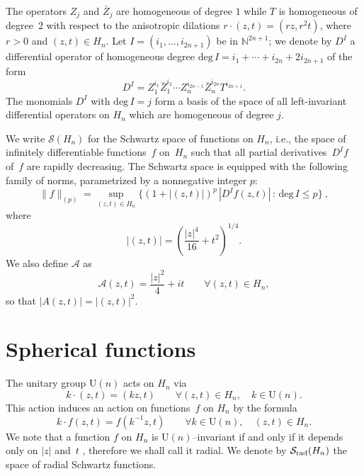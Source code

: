 \documentclass[12pt,a4paper]{amsart}
\theoremstyle{plain}
\theoremstyle{definition}
\numberwithin{equation}{section}
\begin{document}
The operators $Z_j$ and $\bar Z_j$ are homogeneous of degree $1$
while $T$ is homogeneous of degree~$2$
with respect to the anisotropic dilations
$r\cdot (z,t)=(rz,r^2t)$, where $r>0$ and $(z,t)\in {{H_{n}}}$.
Let $I=(i_1,\ldots,i_{2{n}+1})$ be in ${\mathbb N}^{2{n}+1}$;
we denote by ${{D}}^I$ a
differential operator of homogeneous degree 
$\text{deg}\,I=i_1+\cdots+i_{2{n}}+2i_{2{n}+1}$ of the form
\begin{equation}
\label{monomi}
{{D}}^I=Z_{1}^{i_1} \bar Z_1^{i_2}
\cdots Z_{n}^{i_{2{n}-1}} \bar Z_n^{i_{2{n}}} T^{i_{2{n}+1}} .
\end{equation}
The monomials ${{D}}^I$ with  $\text{deg}\,I=j$
form a basis of the space of all left-invariant differential operators on ${{H_{n}}}$ 
which are homogeneous of degree
$j$.

We write ${\mathcal S} ({{H_{n}}})$ for the Schwartz space of
functions on ${{H_{n}}}$, i.e., the space of infinitely differentiable
functions~$f$ on~${{H_{n}}}$ such that
all  partial derivatives~${{D}}^I f$ of~$f$
are rapidly decreasing.
The Schwartz space is equipped with the following
family of norms, parametrized by a nonnegative integer $p$:
$$
\|f\|_{(p)}=\sup_{(z,t)\in {{H_{n}}}}\{(1+| (z,t)|)^{p}\, |{{D}}^I f(z,t)|
\,:\, \text{deg}\, I\leq p\}\ ,
$$
where 
\begin{equation}\label{norm}
| (z,t)|=\left( \frac{|z|^4}{16}+t^2\right)^{1/4} .
\end{equation}
We also define ${\mathcal A}$ as    
$$
\mathcal A(z,t)= \frac{|z|^2}{4}+it 
\qquad \forall (z,t)\in {{H_{n}}},
$$ 
so that 
$
|A(z,t)|=| (z,t)|^2.
$

\section{Spherical functions}
The unitary group ${{\text{U}({n})}}$  
acts on ${{H_{n}}}$ via
$$
k\cdot (z,t)=(kz, t) \qquad \forall (z,t)\in {{H_{n}}},\quad
k\in {{\text{U}({n})}}.
$$ 
This action induces an action on functions~$f$ on ${{H_{n}}}$ by the formula
$$
k\cdot f(z,t)=f(k^{-1}z,t)\qquad \forall k\in {{\text{U}({n})}},\quad (z,t)\in {{H_{n}}}.
$$
We note that a function $f$ on ${{H_{n}}}$ is ${{\text{U}({n})}}$--invariant if and only if
it depends
only on $|z|$ and~$t$
, therefore we shall call it radial.
We denote by ${{\mathcal S}_{\text{\rm rad}}({{H_{n}}})}$ the space
 of  radial
 Schwartz  functions.
  
\end{document}
